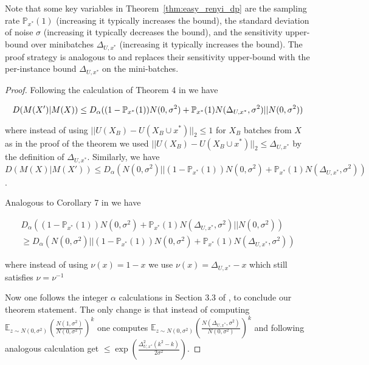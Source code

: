 Note that some key variables in Theorem~\ref{thm:easy_renyi_dp} are the sampling rate $\mathbb{P}_{x^*}(1)$ (increasing it typically increases the bound), the standard deviation of noise $\sigma$ (increasing it typically decreases the bound), and the sensitivity upper-bound over minibatches $\Delta_{U,x^*}$ (increasing it typically increases the bound). The proof strategy is analogous to \citet{mironov2019r} and replaces their sensitivity upper-bound with the per-instance bound $\Delta_{U,x^*}$ on the mini-batches. 


\begin{proof}
    Following the calculation of Theorem 4 in \citet{mironov2019r} we have 

    
    $$D(M(X')| M(X)) \\ \leq D_{\alpha}((1-\mathbb{P}_{x^*}(1))N(0,\sigma^2) + \mathbb{P}_{x^*}(1)N(\Delta_{U,x^*},\sigma^2)|| N(0,\sigma^2))$$
    
    where instead of using $||U(X_B) - U(X_B \cup x^*)||_2 \leq 1$ for $X_B$ batches from $X$ as in the proof of the theorem we used $||U(X_B) - U(X_B \cup x^*)||_2 \leq \Delta_{U,x^*}$ by the definition of $\Delta_{U,x^*}$. Similarly, we have $D(M(X)| M(X')) \leq D_{\alpha}( N(0,\sigma^2) || (1-\mathbb{P}_{x^*}(1))N(0,\sigma^2) + \mathbb{P}_{x^*}(1)N(\Delta_{U,x^*},\sigma^2))$.

    Analogous to Corollary 7 in \citet{mironov2019r} we have

    \begin{multline}
        D_{\alpha}((1-\mathbb{P}_{x^*}(1))N(0,\sigma^2) + \mathbb{P}_{x^*}(1)N(\Delta_{U,x^*},\sigma^2)|| N(0,\sigma^2)) \\ \geq D_{\alpha}( N(0,\sigma^2) || (1-\mathbb{P}_{x^*}(1))N(0,\sigma^2) + \mathbb{P}_{x^*}(1)N(\Delta_{U,x^*},\sigma^2))
    \end{multline}
    
    where instead of using $\nu(x) = 1 -x$ we use $\nu(x) = \Delta_{U,x^*} - x $ which still satisfies $\nu = \nu^{-1}$

    Now one follows the integer $\alpha$ calculations in Section 3.3 of \citet{mironov2019r}, to conclude our theorem statement. The only change is that instead of computing $\mathbb{E}_{z \sim N(0,\sigma^2)}(\frac{N(1,\sigma^2)}{N(0,\sigma^2)})^k$ one computes $\mathbb{E}_{z \sim N(0,\sigma^2)}(\frac{N(\Delta_{U,x^*},\sigma^2)}{N(0,\sigma^2)})^k$ and following analogous calculation get $\leq \exp(\frac{\Delta_{U,x^*}^2(k^2 - k)}{2 \sigma^2})$.

    
\end{proof}






